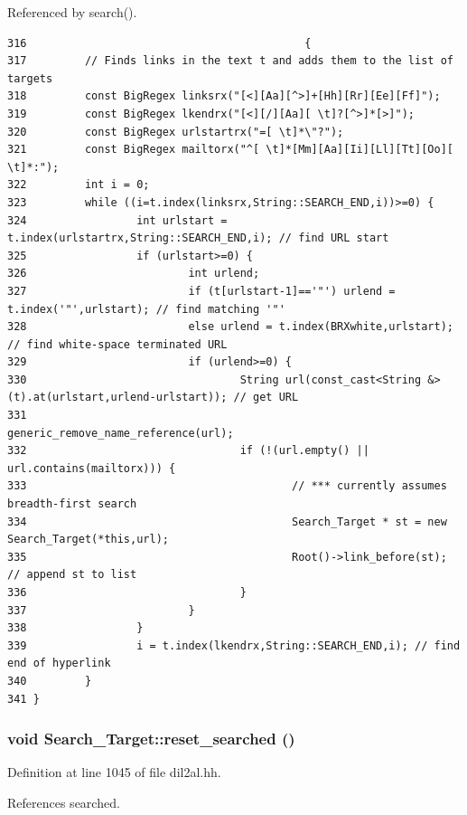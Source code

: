 Referenced by search().



\footnotesize\begin{verbatim}316                                           {
317         // Finds links in the text t and adds them to the list of targets
318         const BigRegex linksrx("[<][Aa][^>]+[Hh][Rr][Ee][Ff]");
319         const BigRegex lkendrx("[<][/][Aa][ \t]?[^>]*[>]");
320         const BigRegex urlstartrx("=[ \t]*\"?");
321         const BigRegex mailtorx("^[ \t]*[Mm][Aa][Ii][Ll][Tt][Oo][ \t]*:");
322         int i = 0;
323         while ((i=t.index(linksrx,String::SEARCH_END,i))>=0) {
324                 int urlstart = t.index(urlstartrx,String::SEARCH_END,i); // find URL start
325                 if (urlstart>=0) {
326                         int urlend;
327                         if (t[urlstart-1]=='"') urlend = t.index('"',urlstart); // find matching '"'
328                         else urlend = t.index(BRXwhite,urlstart); // find white-space terminated URL
329                         if (urlend>=0) {
330                                 String url(const_cast<String &>(t).at(urlstart,urlend-urlstart)); // get URL
331                                 generic_remove_name_reference(url);
332                                 if (!(url.empty() || url.contains(mailtorx))) {
333                                         // *** currently assumes breadth-first search
334                                         Search_Target * st = new Search_Target(*this,url);
335                                         Root()->link_before(st); // append st to list
336                                 }
337                         }
338                 }
339                 i = t.index(lkendrx,String::SEARCH_END,i); // find end of hyperlink
340         }       
341 }
\end{verbatim}\normalsize 
{}
\subsubsection{\setlength{\rightskip}{0pt plus 5cm}void Search\_\-Target::reset\_\-searched ()\hspace{0.3cm}{\tt  [inline]}}\label{classSearch__Target_a6}




Definition at line 1045 of file dil2al.hh.

References searched.



